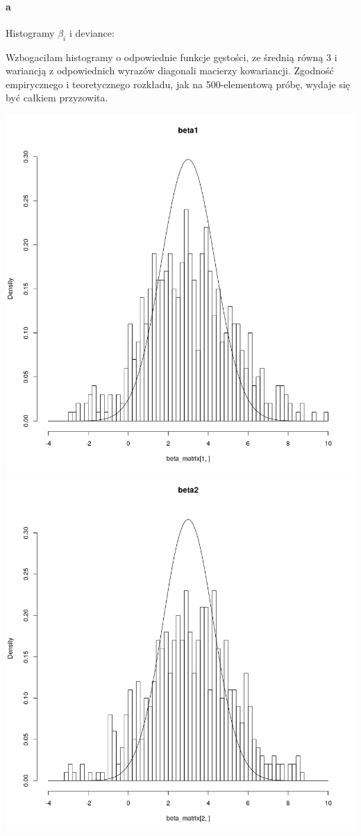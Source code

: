 \documentclass[a4paper,11pt]{article}
\begin{document}
\paragraph{a} Histogramy $\beta_{i}$  i deviance:

Wzbogaciłam histogramy o odpowiednie funkcje gęstości, ze średnią równą 3 i wariancją z odpowiednich wyrazów diagonali macierzy kowariancji. Zgodność empirycznego i teoretycznego rozkładu, jak na 500-elementową próbę, wydaje się być całkiem przyzowita.   

\includegraphics[scale=.35]{beta1.png} 
\includegraphics[scale=.335]{beta2.png}
 
\end{document}
